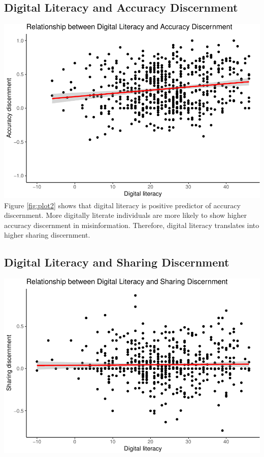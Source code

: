\documentclass[
]{article}
\begin{document}
\hypertarget{digital-literacy-and-accuracy-discernment}{%
\subsection{Digital Literacy and Accuracy Discernment}\label{digital-literacy-and-accuracy-discernment}}

\includegraphics{Replication2019_files/figure-latex/plot2-1.pdf}
Figure \label{fig:plot2} \ref{fig:plot2} shows that digital literacy is positive predictor of accuracy discernment. More digitally literate individuals are more likely to show higher accuracy discernment in misinformation. Therefore, digital literacy translates into higher sharing discernment.

\hypertarget{digital-literacy-and-sharing-discernment}{%
\subsection{Digital Literacy and Sharing Discernment}\label{digital-literacy-and-sharing-discernment}}

\includegraphics{Replication2019_files/figure-latex/plot3-1.pdf}
\end{document}
